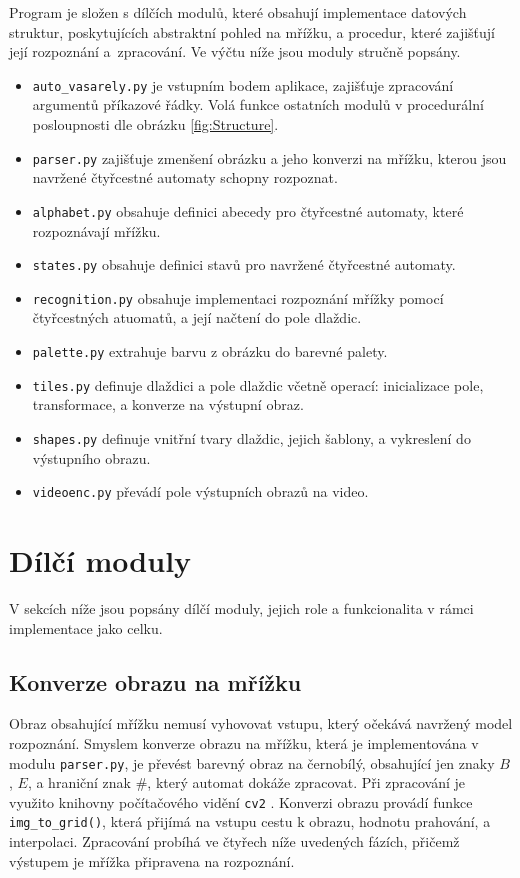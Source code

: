 Program je složen s dílčích modulů, které obsahují implementace datových struktur, poskytujících abstraktní pohled na mřížku, a procedur, které zajišťují její rozpoznání a~zpracování. Ve výčtu níže jsou moduly stručně popsány.

\begin{itemize}
    \item \verb|auto_vasarely.py| je vstupním bodem aplikace, zajišťuje zpracování argumentů příkazové řádky. Volá funkce ostatních modulů v procedurální posloupnosti dle obrázku \ref{fig:Structure}.
    \item \verb|parser.py| zajišťuje zmenšení obrázku a jeho konverzi na mřížku, kterou jsou navržené čtyřcestné automaty schopny rozpoznat.
    \item \verb|alphabet.py| obsahuje definici abecedy pro čtyřcestné automaty, které rozpoznávají mřížku.
    \item \verb|states.py| obsahuje definici stavů pro navržené čtyřcestné automaty.
    \item \verb|recognition.py| obsahuje implementaci rozpoznání mřížky pomocí čtyřcestných atuomatů, a její načtení do pole dlaždic.
    \item \verb|palette.py| extrahuje barvu z obrázku do barevné palety.
    \item \verb|tiles.py| definuje dlaždici a pole dlaždic včetně operací: inicializace pole, transformace, a konverze na výstupní obraz.
    \item \verb|shapes.py| definuje vnitřní tvary dlaždic, jejich šablony, a vykreslení do výstupního obrazu.
    \item \verb|videoenc.py| převádí pole výstupních obrazů na video.

\end{itemize}

\section{Dílčí moduly}

V sekcích níže jsou popsány dílčí moduly, jejich role a funkcionalita v rámci implementace jako celku.

\subsection*{Konverze obrazu na mřížku}

Obraz obsahující mřížku nemusí vyhovovat vstupu, který očekává navržený model rozpoznání. Smyslem konverze obrazu na mřížku, která je implementována v modulu \verb|parser.py|, je převést barevný obraz na černobílý, obsahující jen znaky $B$,  $E$, a hraniční znak $\#$, který automat dokáže zpracovat. Při zpracování je využito knihovny počítačového vidění \verb|cv2| \cite{cv2}. Konverzi obrazu provádí funkce \verb|img_to_grid()|, která přijímá na vstupu cestu k obrazu, hodnotu prahování, a interpolaci. Zpracování probíhá ve čtyřech níže uvedených fázích, přičemž výstupem je mřížka připravena na rozpoznání.

